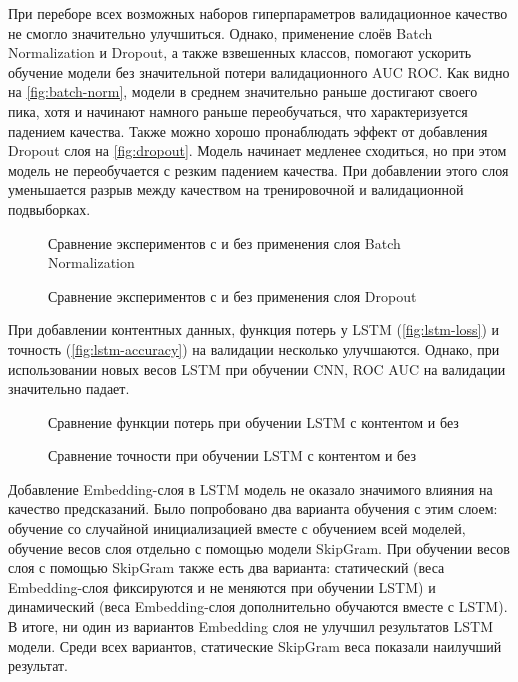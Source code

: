При переборе всех возможных наборов гиперпараметров валидационное качество не смогло значительно улучшиться. Однако, применение слоёв Batch Normalization и Dropout, а также взвешенных классов, помогают ускорить обучение модели без значительной потери валидационного AUC ROC. Как видно на \autoref{fig:batch-norm}, модели в среднем значительно раньше достигают своего пика, хотя и начинают намного раньше переобучаться, что характеризуется падением качества.
Также можно хорошо пронаблюдать эффект от добавления Dropout слоя на \autoref{fig:dropout}. Модель начинает медленее сходиться, но при этом модель не переобучается с резким падением качества. При добавлении этого слоя уменьшается разрыв между качеством на тренировочной и валидационной подвыборках.

\begin{figure}[h]
\noindent{}
\caption{Сравнение экспериментов с и без применения слоя Batch Normalization}
\label{fig:batch-norm}

\end{figure}
\begin{figure}[h]

\noindent{}
\caption{Сравнение экспериментов с и без применения слоя Dropout}
\label{fig:dropout}

\end{figure}

При добавлении контентных данных, функция потерь у LSTM (\autoref{fig:lstm-loss}) и точность (\autoref{fig:lstm-accuracy}) на валидации несколько улучшаются. Однако, при использовании новых весов LSTM при обучении CNN, ROC AUC на валидации значительно падает.

\begin{figure}[H]

\noindent{}
\caption{Сравнение функции потерь при обучении LSTM с контентом и без}
\label{fig:lstm-loss}

\end{figure}
\begin{figure}[H]
\noindent{}
\caption{Сравнение точности при обучении LSTM с контентом и без}
\label{fig:lstm-accuracy}

\end{figure}

Добавление Embedding-слоя в LSTM модель не оказало значимого влияния на качество предсказаний. Было попробовано два варианта обучения с этим слоем: обучение со случайной инициализацией вместе с обучением всей моделей, обучение весов слоя отдельно с помощью модели SkipGram. При обучении весов слоя с помощью SkipGram также есть два варианта: статический (веса Embedding-слоя фиксируются и не меняются при обучении LSTM) и динамический (веса Embedding-слоя дополнительно обучаются вместе с LSTM).\\
В итоге, ни один из вариантов Embedding слоя не улучшил результатов LSTM модели. Среди всех вариантов, статические SkipGram веса показали наилучший результат.
